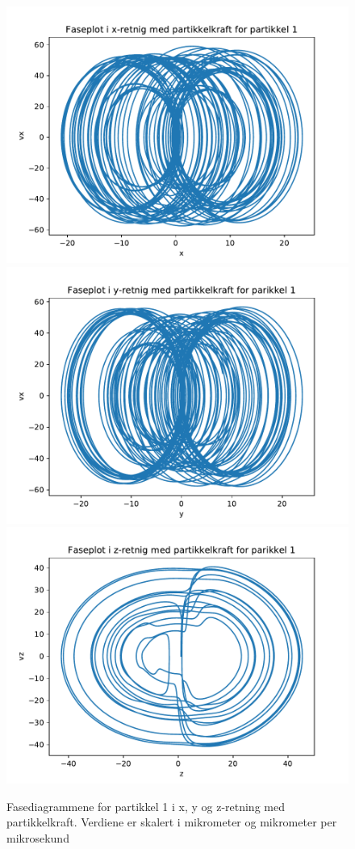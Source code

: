 \documentclass[reprint,english,notitlepage]{revtex4-1}  %
\begin{document}
\begin{figure}[H]
	\label{faseint1}
	\centering 
	\includegraphics[scale=0.4]{../pythonplots/xint1.pdf}
	\includegraphics[scale=0.4]{../pythonplots/yint1.pdf}
	\includegraphics[scale=0.4]{../pythonplots/zint1.pdf}
	\caption{Fasediagrammene for partikkel 1 i x, y og z-retning med partikkelkraft. Verdiene er skalert i mikrometer og mikrometer per mikrosekund}
\end{figure}
\end{document}
